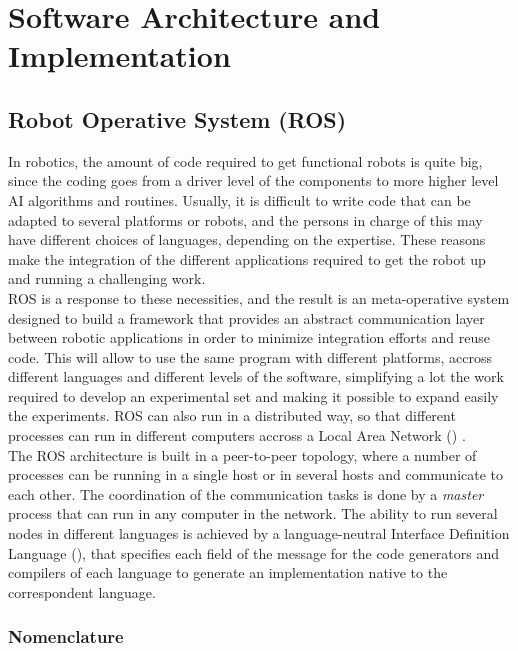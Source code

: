 \chapter{Software Architecture and Implementation}
\label{chap:Software_Architecture_and_Implementation}

\section{Robot Operative System (ROS)}

In robotics, the amount of code required to get functional robots is quite big, since the coding goes from a driver level of the components to more higher level AI algorithms and routines. Usually, it is difficult to write code that can be adapted to several platforms or robots, and the persons in charge of this may have different choices of languages, depending on the expertise. These reasons make the integration of the different applications required to get the robot up and running a challenging work.\\

ROS is a response to these necessities, and the result is an meta-operative system designed to build a framework that provides an abstract communication layer between robotic applications in order to minimize integration efforts and reuse code. This will allow to use the same program with different platforms, accross different languages and different levels of the software, simplifying a lot the work required to develop an experimental set and making it possible to expand easily the experiments. ROS can also run in a distributed way, so that different processes can run in different computers accross a Local Area Network () \cite{Quigley}.\\

The ROS architecture is built in a peer-to-peer topology, where a number of processes can be running in a single host or in several hosts and communicate to each other. The coordination of the communication tasks is done by a \emph{master} process that can run in any computer in the network. The ability to run several nodes in different languages is achieved by a language-neutral Interface Definition Language (), that specifies each field of the message for the code generators and compilers of each language to generate an implementation native to the correspondent language. 

\subsection{Nomenclature}

